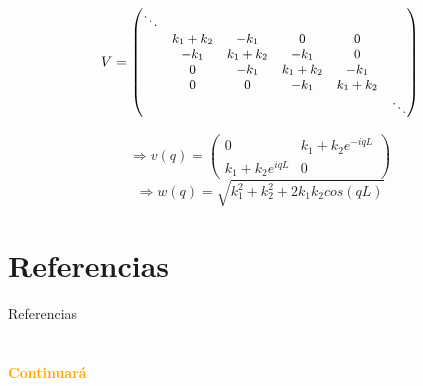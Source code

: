 \documentclass[aspectratio=43]{beamer}
\begin{document}
\begin{frame}{}
\begin{equation}
\small
 V = 
\begin{pmatrix}
\ddots  &  &  &  &  & \\ 
 & k_1+k_2 & -k_1 &0  &0  & \\ 
 &  -k_1&k_1+k_2  & -k_1 &  0& \\ 
 & 0 & -k_1 & k_1+k_2 & -k_1 & \\ 
 &  0& 0 &-k_1  & k_1+k_2 & \\ 
 &  &  &  &  & \ddots 
\end{pmatrix}
\end{equation}

\begin{equation}
    \Rightarrow v(q) = \begin{pmatrix}
0 & k_1+k_2e^{-iqL}\\ 
k_1+k_2e^{iqL} & 0
\end{pmatrix}
\end{equation}
\begin{equation}
\Rightarrow  w(q) = \sqrt{k_1^2+k_2^2+2k_1k_2cos(qL)}
\end{equation}
\end{frame}

 
    
    
 
    
    \section*{Referencias} %
    
        \nocite{Zhang}
        \nocite{Asbáth}
         \nocite{Batra}
         
         \begin{frame}{Referencias}
            \printbibliography
        \end{frame}

    \section{}
    \begin{frame}{}
        \centering
            \Huge\bfseries
        \textcolor{orange}{Continuará}
    \end{frame}
  
\end{document}
